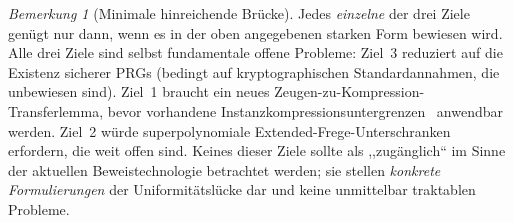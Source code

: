 \documentclass[aps,prd,twocolumn,superscriptaddress,nofootinbib]{revtex4-2}
\theoremstyle{definition}
\theoremstyle{remark}
\newtheorem{remark}[theorem]{Bemerkung}
\begin{document}
\begin{remark}[Minimale hinreichende Brücke]
\label{rem:minimal-bridge}
Jedes \emph{einzelne} der drei Ziele genügt nur dann, wenn es in der oben angegebenen starken Form bewiesen wird. Alle drei Ziele sind selbst fundamentale offene Probleme: Ziel~3 reduziert auf die Existenz sicherer PRGs (bedingt auf kryptographischen Standardannahmen, die unbewiesen sind). Ziel~1 braucht ein neues Zeugen-zu-Kompression-Transferlemma, bevor vorhandene Instanzkompressionsuntergrenzen~\cite{Drucker2015} anwendbar werden. Ziel~2 würde superpolynomiale Extended-Frege-Unterschranken erfordern, die weit offen sind. Keines dieser Ziele sollte als ,,zugänglich`` im Sinne der aktuellen Beweistechnologie betrachtet werden; sie stellen \emph{konkrete Formulierungen} der Uniformitätslücke dar und keine unmittelbar traktablen Probleme.
\end{remark}
\end{document}
